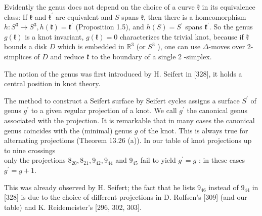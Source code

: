\documentclass[10pt, letterpaper]{article}
\begin{document}
Evidently the genus does not depend on the choice of a curve $\mathfrak{k}$ in its equivalence class: If $\mathfrak{k}$ and $\mathfrak{k}^{\prime}$ are equivalent and $S$ spans $\mathfrak{k}$, then there is a homeomorphism $h: S^{3} \rightarrow S^{3}, h(\mathfrak{k})=\mathfrak{k}^{\prime}$ (Proposition 1.5), and $h(S)=S^{\prime}$ spans $\mathfrak{k}^{\prime}$. So the genus $g(\mathfrak{k})$ is a knot invariant, $g(\mathfrak{k})=0$ characterizes the trivial knot, because if $\mathfrak{k}$ bounds a disk $D$ which is embedded in $\mathbb{R}^{3}$ (or $S^{3}$ ), one can use $\Delta$-moves over 2-simplices of $D$ and reduce $\mathfrak{k}$ to the boundary of a single 2 -simplex.

The notion of the genus was first introduced by H. Seifert in [328], it holds a central position in knot theory.

The method to construct a Seifert surface by Seifert cycles assigns a surface $S^{\prime}$ of genus $g^{\prime}$ to a given regular projection of a knot. We call $g^{\prime}$ the canonical genus associated with the projection. It is remarkable that in many cases the canonical genus coincides with the (minimal) genus $g$ of the knot. This is always true for alternating projections (Theorem 13.26 (a)). In our table of knot projections up to nine crossings\\
only the projections $8_{20}, 8_{21}, 9_{42}, 9_{44}$ and $9_{45}$ fail to yield $g^{\prime}=g$ : in these cases $g^{\prime}=g+1$.

This was already observed by H. Seifert; the fact that he lists $9_{46}$ instead of $9_{44}$ in [328] is due to the choice of different projections in D. Rolfsen's [309] (and our table) and K. Reidemeister's [296, 302, 303].
\end{document}
